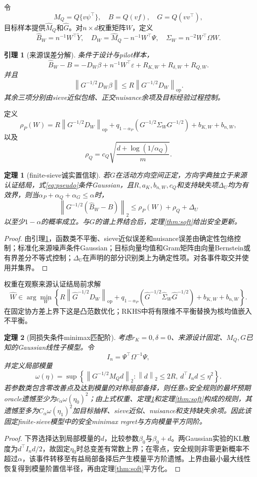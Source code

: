 \documentclass[UTF8,12pt]{ctexart}
\newtheorem{theorem}{定理}
\newtheorem{lemma}{引理}
\newcommand{\norm}[1]{\left\lVert #1\right\rVert}
\newcommand{\op}{\mathrm{op}}
\begin{document}
令
\[
M_Q=Q\{v\psi^\top\},\quad
B=Q(vf),\quad
G=Q(vv^\top),
\]
目标样本提供$\widehat M_Q$和$\widehat G$。对$n\times d$权重矩阵$W$，定义
\[
\widehat B_W=n^{-1}W^\top\widetilde Y,\quad
D_W=\widehat M_Q-n^{-1}W^\top\Psi,\quad
\Sigma_W=n^{-2}W^\top\Omega W.
\]

\begin{lemma}[来源误差分解]\label{lem:decomp}
条件于设计与pilot样本，
\[
\widehat B_W-B
=-D_W\beta+n^{-1}W^\top\varepsilon
+R_{K,W}+R_{\delta,W}+R_{Q,W}.
\]
并且
\[
\norm{G^{-1/2}D_W\beta}
\le R\norm{G^{-1/2}D_W}_{\op}.
\]
其余三项分别由sieve近似包络、正交nuisance余项及目标经验过程控制。
\end{lemma}

定义
\[
\rho_P(W)=
R\norm{G^{-1/2}D_W}_{\op}
+q_{1-\alpha_P}(G^{-1/2}\Sigma_WG^{-1/2})
+b_{K,W}+b_{n,W},
\]
以及
\[
\rho_Q=c_Q\sqrt{\frac{d+\log(1/\alpha_Q)}m}.
\]

\begin{theorem}[finite-sieve诚实置信球]\label{thm:sievecb}
若$G$在活动方向空间正定，方向字典独立于来源认证结局，式\eqref{eq:pseudo}条件Gaussian，且$R,a_K,b_{n,W},c_Q$和支持缺失项$\Delta_U$均为有效界，则当$\alpha_P+\alpha_Q+\alpha_G\le\alpha$时，
\[
\norm{G^{-1/2}(\widehat B_W-B)}_2
\le\rho_P(W)+\rho_Q+\Delta_U
\]
以至少$1-\alpha$的概率成立。与$G$的谱上界结合后，定理\ref{thm:soft}给出安全更新。
\end{theorem}
\begin{proof}
由引理\ref{lem:decomp}，函数类不平衡、sieve近似误差和nuisance误差由确定性包络控制；标准化来源噪声条件Gaussian；目标向量均值和Gram矩阵由向量Bernstein或有界差分不等式控制；$\Delta_U$在声明的部分识别类上为确定性项。对各事件取交并使用并集界。
\end{proof}

权重在观察来源认证结局前求解
\[
\widehat W\in\arg\min_W
\left\{
R\norm{\widehat G^{-1/2}D_W}_{\op}
+q_{1-\alpha_P}(\widehat G^{-1/2}\widehat\Sigma_W\widehat G^{-1/2})
+b_{K,W}+b_{n,W}
\right\}.
\]
在固定协方差上界下这是凸范数优化；RKHS中将有限维不平衡替换为核均值嵌入不平衡。

\begin{theorem}[同损失条件minimax匹配阶]\label{thm:matching}
考虑$r_K=0,\delta=0$、来源设计固定、$M_Q,G$已知的Gaussian线性子模型。令
\[
I_n=\Psi^\top\Omega^{-1}\Psi,
\]
并定义局部模量
\[
\omega(\eta)=
\sup\left\{
\norm{G^{-1/2}M_Qd}_2:
\norm d_2\le2R,
\ d^\top I_nd\le\eta^2
\right\}.
\]
若参数类包含零改善点及达到模量的对称局部备择，则任意$\alpha$安全规则的最坏预期oracle遗憾至少为$c_\alpha\omega(\eta_0)^2$；由上式权重、定理\ref{thm:sievecb}和定理\ref{thm:soft}构成的规则，其遗憾至多为$C_\alpha\omega(\eta_1)^2$加目标抽样、sieve近似、nuisance和支持缺失余项。因此该固定finite-sieve模型中的安全minimax regret与方向模量平方同阶。
\end{theorem}
\begin{proof}
下界选择达到局部模量的$d$，比较参数$\beta_0$与$\beta_0+d$。两Gaussian实验的KL散度为$d^\top I_nd/2$，故固定$\eta_0$时总变差有常数上界；在零点，安全规则非零更新概率不超过$\alpha$，该事件转移至有益局部备择后产生模量平方阶遗憾。上界由最小最大线性恢复得到模量阶置信半径，再由定理\ref{thm:soft}平方化。
\end{proof}
\end{document}
